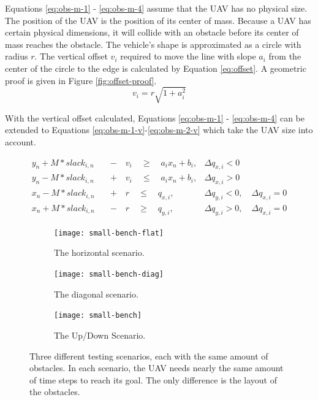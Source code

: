 Equations \ref{eq:obs-m-1} - \ref{eq:obs-m-4} assume that the UAV has no physical size. The position of the UAV is the position of its center of mass. Because a UAV has certain physical dimensions, it will collide with an obstacle before its center of mass reaches the obstacle. The vehicle's shape is approximated as a circle with radius $r$. The vertical offset $v_i$ required to move the line with slope $a_i$ from the center of the circle to the edge is calculated by Equation \ref{eq:offset}. A geometric proof is given in Figure \ref{fig:offset-proof}.
\begin{equation}
v_{i} = r \sqrt{1 + a_i^2}
\label{eq:offset}
\end{equation}

With the vertical offset calculated, Equations \ref{eq:obs-m-1} - \ref{eq:obs-m-4} can be extended to Equations \ref{eq:obs-m-1-v}-\ref{eq:obs-m-2-v} which take the UAV size into account.

\begin{align}
y_{n} + M*slack_{i,n} \quad &- \quad v_i \quad \geq 
\quad a_{i} x_{n} + b_{i},  	
& \Delta q_{x,i} < 0 							 	
\label{eq:obs-m-1-v} \\
y_{n} - M*slack_{i,n} \quad &+ \quad v_i \quad \leq 
\quad a_{i} x_{n} + b_{i},
& \Delta q_{x,i} > 0 							 	
\label{eq:obs-m-2-v} \\
x_{n} - M*slack_{i,n} \quad &+ \quad r \quad \leq
\quad  q_{x,i}, 		
& \Delta q_{y,i} < 0, \quad \Delta q_{x,i} = 0 	
\label{eq:obs-m-3-v} \\
x_{n} + M*slack_{i,n} \quad &- \quad r \quad \geq 
\quad q_{y,i},  		
& \Delta q_{y,i} > 0, \quad \Delta q_{x,i} = 0 	
\label{eq:obs-m-4-v}
\end{align}


\begin{figure}
	\centering
	\begin{subfigure}[t]{1\columnwidth}
        		\texttt{[image: small-bench-flat]}
        		\caption{The horizontal scenario.}
        		\label{fig:convex-straight}
	\end{subfigure}
	\par\bigskip
	\begin{subfigure}[t]{1\columnwidth}
        		\texttt{[image: small-bench-diag]}
        		\caption{The diagonal scenario.}
        		 \label{fig:convex-diag}
	\end{subfigure}	
	\par\bigskip
	\begin{subfigure}[t]{0.8\columnwidth}
        		\texttt{[image: small-bench]}
        		\caption{The Up/Down Scenario.}
        		 \label{fig:convex-full}
	\end{subfigure}	
    \caption{Three different testing scenarios, each with the same amount of obstacles. In each scenario, the UAV needs nearly the same amount of time steps to reach its goal. The only difference is the layout of the obstacles.}
    \label{fig:benchmarks}     
\end{figure}
\clearpage
